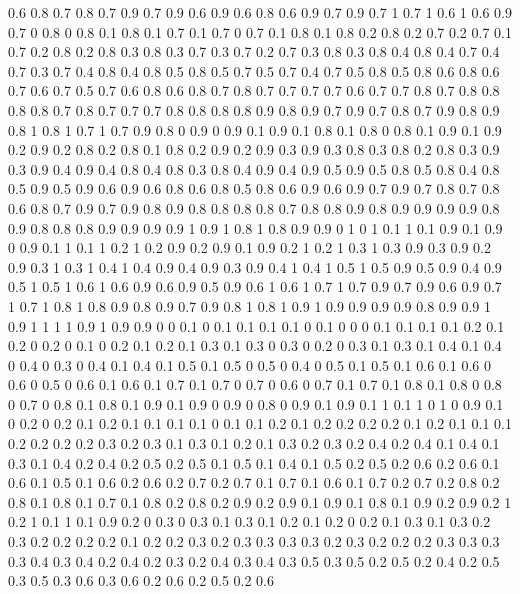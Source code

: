 0.6 0.8
0.7 0.8
0.7 0.9
0.7 0.9
0.6 0.9
0.6 0.8
0.6 0.9
0.7 0.9
0.7 1
0.7 1
0.6 1
0.6 0.9
0.7 0
0.8 0
0.8 0.1
0.8 0.1
0.7 0.1
0.7 0
0.7 0.1
0.8 0.1
0.8 0.2
0.8 0.2
0.7 0.2
0.7 0.1
0.7 0.2
0.8 0.2
0.8 0.3
0.8 0.3
0.7 0.3
0.7 0.2
0.7 0.3
0.8 0.3
0.8 0.4
0.8 0.4
0.7 0.4
0.7 0.3
0.7 0.4
0.8 0.4
0.8 0.5
0.8 0.5
0.7 0.5
0.7 0.4
0.7 0.5
0.8 0.5
0.8 0.6
0.8 0.6
0.7 0.6
0.7 0.5
0.7 0.6
0.8 0.6
0.8 0.7
0.8 0.7
0.7 0.7
0.7 0.6
0.7 0.7
0.8 0.7
0.8 0.8
0.8 0.8
0.7 0.8
0.7 0.7
0.7 0.8
0.8 0.8
0.8 0.9
0.8 0.9
0.7 0.9
0.7 0.8
0.7 0.9
0.8 0.9
0.8 1
0.8 1
0.7 1
0.7 0.9
0.8 0
0.9 0
0.9 0.1
0.9 0.1
0.8 0.1
0.8 0
0.8 0.1
0.9 0.1
0.9 0.2
0.9 0.2
0.8 0.2
0.8 0.1
0.8 0.2
0.9 0.2
0.9 0.3
0.9 0.3
0.8 0.3
0.8 0.2
0.8 0.3
0.9 0.3
0.9 0.4
0.9 0.4
0.8 0.4
0.8 0.3
0.8 0.4
0.9 0.4
0.9 0.5
0.9 0.5
0.8 0.5
0.8 0.4
0.8 0.5
0.9 0.5
0.9 0.6
0.9 0.6
0.8 0.6
0.8 0.5
0.8 0.6
0.9 0.6
0.9 0.7
0.9 0.7
0.8 0.7
0.8 0.6
0.8 0.7
0.9 0.7
0.9 0.8
0.9 0.8
0.8 0.8
0.8 0.7
0.8 0.8
0.9 0.8
0.9 0.9
0.9 0.9
0.8 0.9
0.8 0.8
0.8 0.9
0.9 0.9
0.9 1
0.9 1
0.8 1
0.8 0.9
0.9 0
1 0
1 0.1
1 0.1
0.9 0.1
0.9 0
0.9 0.1
1 0.1
1 0.2
1 0.2
0.9 0.2
0.9 0.1
0.9 0.2
1 0.2
1 0.3
1 0.3
0.9 0.3
0.9 0.2
0.9 0.3
1 0.3
1 0.4
1 0.4
0.9 0.4
0.9 0.3
0.9 0.4
1 0.4
1 0.5
1 0.5
0.9 0.5
0.9 0.4
0.9 0.5
1 0.5
1 0.6
1 0.6
0.9 0.6
0.9 0.5
0.9 0.6
1 0.6
1 0.7
1 0.7
0.9 0.7
0.9 0.6
0.9 0.7
1 0.7
1 0.8
1 0.8
0.9 0.8
0.9 0.7
0.9 0.8
1 0.8
1 0.9
1 0.9
0.9 0.9
0.9 0.8
0.9 0.9
1 0.9
1 1
1 1
0.9 1
0.9 0.9
0 0
0.1 0
0.1 0.1
0.1 0.1
0 0.1
0 0
0 0.1
0.1 0.1
0.1 0.2
0.1 0.2
0 0.2
0 0.1
0 0.2
0.1 0.2
0.1 0.3
0.1 0.3
0 0.3
0 0.2
0 0.3
0.1 0.3
0.1 0.4
0.1 0.4
0 0.4
0 0.3
0 0.4
0.1 0.4
0.1 0.5
0.1 0.5
0 0.5
0 0.4
0 0.5
0.1 0.5
0.1 0.6
0.1 0.6
0 0.6
0 0.5
0 0.6
0.1 0.6
0.1 0.7
0.1 0.7
0 0.7
0 0.6
0 0.7
0.1 0.7
0.1 0.8
0.1 0.8
0 0.8
0 0.7
0 0.8
0.1 0.8
0.1 0.9
0.1 0.9
0 0.9
0 0.8
0 0.9
0.1 0.9
0.1 1
0.1 1
0 1
0 0.9
0.1 0
0.2 0
0.2 0.1
0.2 0.1
0.1 0.1
0.1 0
0.1 0.1
0.2 0.1
0.2 0.2
0.2 0.2
0.1 0.2
0.1 0.1
0.1 0.2
0.2 0.2
0.2 0.3
0.2 0.3
0.1 0.3
0.1 0.2
0.1 0.3
0.2 0.3
0.2 0.4
0.2 0.4
0.1 0.4
0.1 0.3
0.1 0.4
0.2 0.4
0.2 0.5
0.2 0.5
0.1 0.5
0.1 0.4
0.1 0.5
0.2 0.5
0.2 0.6
0.2 0.6
0.1 0.6
0.1 0.5
0.1 0.6
0.2 0.6
0.2 0.7
0.2 0.7
0.1 0.7
0.1 0.6
0.1 0.7
0.2 0.7
0.2 0.8
0.2 0.8
0.1 0.8
0.1 0.7
0.1 0.8
0.2 0.8
0.2 0.9
0.2 0.9
0.1 0.9
0.1 0.8
0.1 0.9
0.2 0.9
0.2 1
0.2 1
0.1 1
0.1 0.9
0.2 0
0.3 0
0.3 0.1
0.3 0.1
0.2 0.1
0.2 0
0.2 0.1
0.3 0.1
0.3 0.2
0.3 0.2
0.2 0.2
0.2 0.1
0.2 0.2
0.3 0.2
0.3 0.3
0.3 0.3
0.2 0.3
0.2 0.2
0.2 0.3
0.3 0.3
0.3 0.4
0.3 0.4
0.2 0.4
0.2 0.3
0.2 0.4
0.3 0.4
0.3 0.5
0.3 0.5
0.2 0.5
0.2 0.4
0.2 0.5
0.3 0.5
0.3 0.6
0.3 0.6
0.2 0.6
0.2 0.5
0.2 0.6
